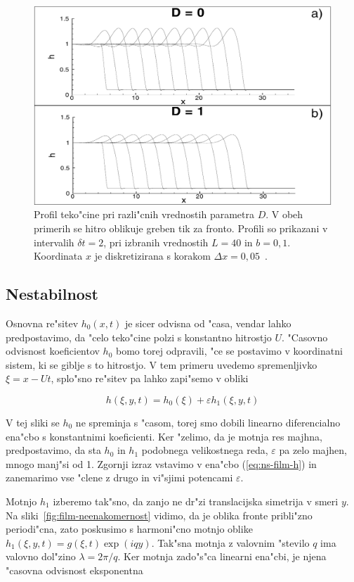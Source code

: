 \documentclass[a4paper,12pt]{article}
\newcommand{\eps}{\varepsilon}
\begin{document}
\begin{figure}[h]
 \centering
 \includegraphics[width=.8\textwidth]{./Slike/film-osnovna-resitev}
 \caption{Profil teko"cine pri razli"cnih vrednostih parametra $D$. V obeh primerih se hitro oblikuje greben tik za fronto. Profili so prikazani v intervalih $\delta t = 2$, pri izbranih vrednostih $L = 40$ in $b=0,1$. Koordinata $x$ je diskretizirana s korakom $\Delta x = 0,05$~\cite{kondic}. }
 \label{fig:film-osnovna}
\end{figure}


\subsection{Nestabilnost}

Osnovna re"sitev $h_0(x, t)$ je sicer odvisna od "casa, vendar lahko predpostavimo, da "celo teko"cine polzi s konstantno hitrostjo $U$. "Casovno odvisnost koeficientov $h_0$ bomo torej odpravili, "ce se postavimo v koordinatni sistem, ki se giblje s to hitrostjo. V tem primeru uvedemo spremenljivko $\xi = x - Ut$, splo"sno re"sitev pa lahko zapi"semo v obliki

\begin{equation}
 h(\xi, y, t) = h_0(\xi) + \eps h_1(\xi, y, t)
\end{equation}

V tej sliki se $h_0$ ne spreminja s "casom, torej smo dobili linearno diferencialno ena"cbo s konstantnimi koeficienti. Ker "zelimo, da je motnja res majhna, predpostavimo, da sta $h_0$ in $h_1$ podobnega velikostnega reda, $\eps$ pa zelo majhen, mnogo manj"si od 1. Zgornji izraz vstavimo v ena"cbo (\ref{eq:ns-film-h}) in zanemarimo vse "clene z drugo in vi"sjimi potencami $\eps$. 

Motnjo $h_1$ izberemo tak"sno, da zanjo ne dr"zi translacijska simetrija v smeri $y$. Na sliki~\ref{fig:film-neenakomernost} vidimo, da je oblika fronte pribli"zno periodi"cna, zato poskusimo s harmoni"cno motnjo oblike $h_1(\xi, y, t) = g(\xi, t) \exp (i q y)$. Tak"sna motnja z valovnim "stevilo $q$ ima valovno dol"zino $\lambda = 2\pi/q$. Ker motnja zado"s"ca linearni ena"cbi, je njena "casovna odvisnost eksponentna
\end{document}
